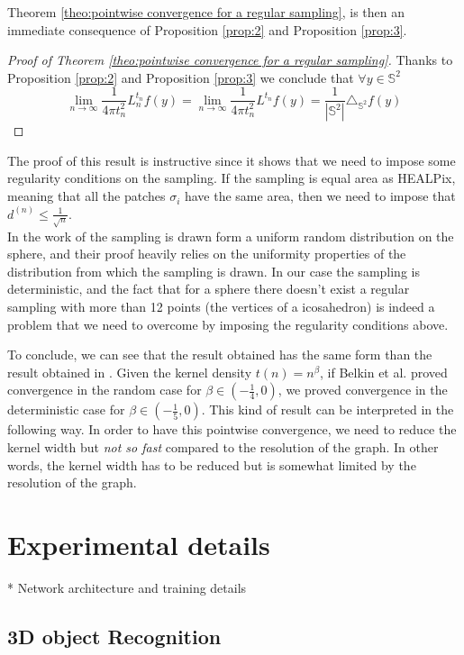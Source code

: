 \documentclass{article} %
\begin{document}
Theorem  \ref{theo:pointwise convergence for a regular sampling}, is then an immediate consequence of Proposition \ref{prop:2} and Proposition \ref{prop:3}.
\begin{proof}[Proof of Theorem \ref{theo:pointwise convergence for a regular sampling}]
	Thanks to Proposition \ref{prop:2} and Proposition \ref{prop:3}	we conclude that $\forall y\in\mathbb S^2 $
	$$\lim_{n\to\infty}\frac{1}{4\pi t_n^2} L_n^{t_n}f(y) =  \lim_{n\to\infty}\frac{1}{4\pi t_n^2} L^{t_n}f(y) = \frac{1}{|\mathbb S^2|}\triangle_{\mathbb S^2}f(y) $$
\end{proof}

The proof of this result is instructive since it shows that we need to impose some regularity conditions on the sampling. If the sampling is equal area as HEALPix, meaning that all the patches $\sigma_i$ have the same area, then we need to impose that $ d^{(n)}\leq \frac{1}{\sqrt{n}}$. \\
In the work of \cite{belkin2005towards} the sampling is drawn form a uniform random distribution on the sphere, and their proof heavily relies on the uniformity properties of the distribution from which the sampling is drawn. In our case the sampling is deterministic, and the fact that for a sphere there doesn't exist a regular sampling with more than 12 points (the vertices of a icosahedron) is indeed a problem that we need to overcome by imposing the regularity conditions above.

To conclude, we can see that the result obtained has the same form than the result obtained in \cite{belkin2005towards}. Given the kernel density $t(n)=n^\beta$, if Belkin et al. proved convergence in the random case for $\beta \in (-\frac{1}{4}, 0)$, we proved convergence in the deterministic case for $\beta \in (-\frac{1}{5}, 0)$. This kind of result can be interpreted in the following way. In order to have this pointwise convergence, we need to reduce the kernel width but \emph{not so fast} compared to the resolution of the graph. In other words, the kernel width has to be reduced but is somewhat limited by the resolution of the graph.


\section{Experimental details}

* Network architecture and training details

\subsection{3D object Recognition}
\end{document}
